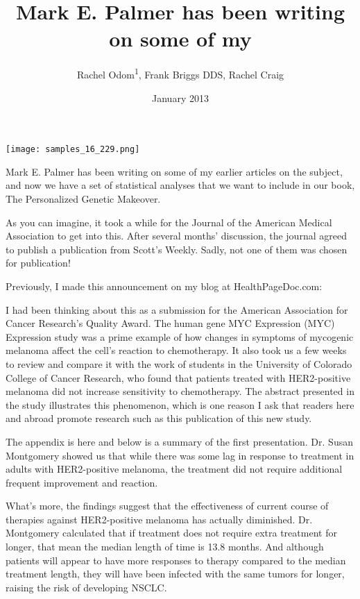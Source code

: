 \documentclass{article}
\title{Mark E. Palmer has been writing on some of my}
\author{Rachel Odom\textsuperscript{1},  Frank Briggs DDS,  Rachel Craig}
\affil{\textsuperscript{1}Second Military Medical University}
\date{January 2013}
\begin{document}
\maketitle

\begin{center}
\begin{minipage}{0.75\linewidth}
\texttt{[image: samples\_16\_229.png]}
\end{minipage}
\end{center}

Mark E. Palmer has been writing on some of my earlier articles on the subject, and now we have a set of statistical analyses that we want to include in our book, The Personalized Genetic Makeover.

As you can imagine, it took a while for the Journal of the American Medical Association to get into this. After several months’ discussion, the journal agreed to publish a publication from Scott’s Weekly. Sadly, not one of them was chosen for publication!

Previously, I made this announcement on my blog at HealthPageDoc.com:

I had been thinking about this as a submission for the American Association for Cancer Research’s Quality Award. The human gene MYC Expression (MYC) Expression study was a prime example of how changes in symptoms of mycogenic melanoma affect the cell’s reaction to chemotherapy. It also took us a few weeks to review and compare it with the work of students in the University of Colorado College of Cancer Research, who found that patients treated with HER2-positive melanoma did not increase sensitivity to chemotherapy. The abstract presented in the study illustrates this phenomenon, which is one reason I ask that readers here and abroad promote research such as this publication of this new study.

The appendix is here and below is a summary of the first presentation. Dr. Susan Montgomery showed us that while there was some lag in response to treatment in adults with HER2-positive melanoma, the treatment did not require additional frequent improvement and reaction.

What’s more, the findings suggest that the effectiveness of current course of therapies against HER2-positive melanoma has actually diminished. Dr. Montgomery calculated that if treatment does not require extra treatment for longer, that mean the median length of time is 13.8 months. And although patients will appear to have more responses to therapy compared to the median treatment length, they will have been infected with the same tumors for longer, raising the risk of developing NSCLC.
\end{document}
